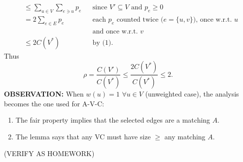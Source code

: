 \begin{align*}
&\leq\sum_{u\in V}\sum_{e\ni u}p_e&&\text{since $V'\subseteq V$ and $p_e\geq0$}\\
&=2\sum_{e\in E}p_e&&\text{each $p_e$ counted twice ($e=\{u,v\}$), once w.r.t. $u$}\\
&&&\text{and once w.r.t. $v$}\\
&\leq2C(V^*)&&\text{by (1).}
\end{align*}
Thus
\[\rho=\frac{C(V')}{C(V^*)}\leq\frac{2C(V^*)}{C(V^*)}\leq2.\]
\textbf{OBSERVATION:} When $w(u)=1$ $\forall u\in V$ (unweighted case), the analysis becomes the one used for A-V-C:
\begin{enumerate}
\item The fair property implies that the selected edges are a matching $A$.
\item The lemma says that any VC must have size $\geq$ any matching $A$.
\end{enumerate}
(VERIFY AS HOMEWORK)
